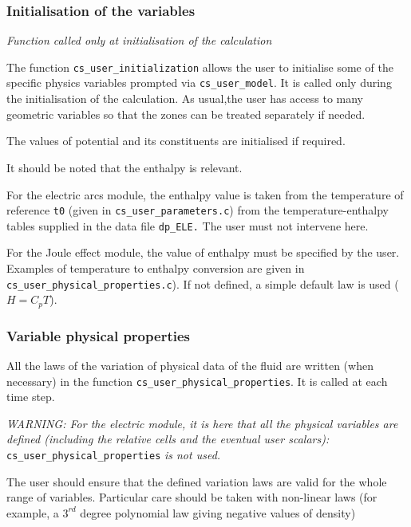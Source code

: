 \subsubsection{Initialisation of the variables}

\noindent
\textit{Function called only at initialisation of the calculation}

The function \texttt{cs\_user\_initialization} allows the user to initialise some of the specific physics variables prompted via \texttt{cs\_user\_model}. It is called only during the initialisation of the calculation. As usual,the user has access to many geometric variables so
 that the zones can be treated separately if needed.

The values of potential and its constituents are initialised if required.

It should be noted that the enthalpy is relevant.

\begin{list}{-}{}
\item For the electric arcs module, the enthalpy value is taken from the temperature
 of reference \texttt{t0} (given in \texttt{cs\_user\_parameters.c})
 from the temperature-enthalpy tables supplied in the data file \texttt{dp\_ELE.}
 The user must not intervene here.
\item For the Joule effect module, the value of enthalpy must be specified by the user.
 Examples of temperature to enthalpy conversion are given in
 \texttt{cs\_user\_physical\_properties.c}). If not defined, a simple default
 law is used ($H = C_p T$).
\end{list}

\subsubsection{Variable physical properties}

All the laws of the variation of physical data of the fluid are written (when necessary)
in the function \texttt{cs\_user\_physical\_properties}. It is called at each time step.

{\em WARNING: For the electric module, it is here that all the physical variables are defined
 (including the relative cells and the eventual user scalars):} \texttt{cs\_user\_physical\_properties} {\em {is not used.}}

The user should ensure that the defined variation laws are valid for the whole range of
variables. Particular care should be taken with non-linear laws (for example, a
 $3^{rd}$ degree polynomial law giving negative values of density)

